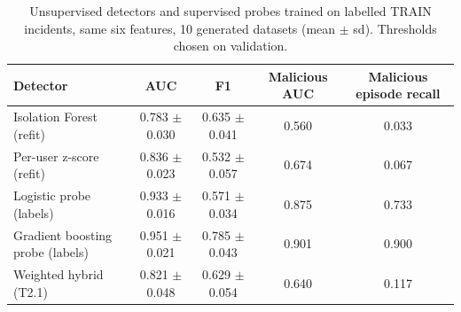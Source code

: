 \begin{table}[t]
\centering
\scriptsize
\caption{Unsupervised detectors and supervised probes trained on labelled TRAIN incidents, same six features, 10 generated datasets (mean $\pm$ sd). Thresholds chosen on validation.}
\label{tab:supervised}
\begin{tabular}{lcccc}
\hline
Detector & AUC & F1 & Malicious AUC & Malicious episode recall \\
\hline
Isolation Forest (refit) & 0.783 $\pm$ 0.030 & 0.635 $\pm$ 0.041 & 0.560 & 0.033 \\
Per-user z-score (refit) & 0.836 $\pm$ 0.023 & 0.532 $\pm$ 0.057 & 0.674 & 0.067 \\
Logistic probe (labels) & 0.933 $\pm$ 0.016 & 0.571 $\pm$ 0.034 & 0.875 & 0.733 \\
Gradient boosting probe (labels) & 0.951 $\pm$ 0.021 & 0.785 $\pm$ 0.043 & 0.901 & 0.900 \\
Weighted hybrid (T2.1) & 0.821 $\pm$ 0.048 & 0.629 $\pm$ 0.054 & 0.640 & 0.117 \\
\hline
\end{tabular}
\end{table}
